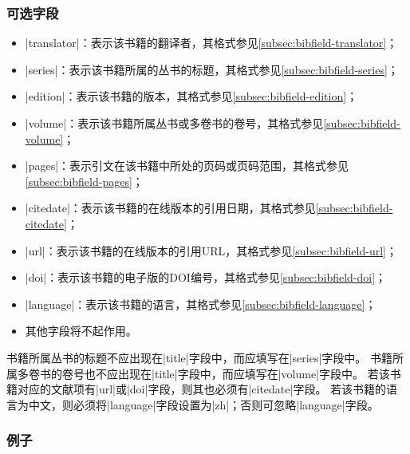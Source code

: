 \subsubsection{可选字段}

\begin{itemize}
\item |translator|：表示该书籍的翻译者，其格式参见\ref{subsec:bibfield-translator}；
\item |series|：表示该书籍所属的丛书的标题，其格式参见\ref{subsec:bibfield-series}；
\item |edition|：表示该书籍的版本，其格式参见\ref{subsec:bibfield-edition}；
\item |volume|：表示该书籍所属丛书或多卷书的卷号，其格式参见\ref{subsec:bibfield-volume}；
\item |pages|：表示引文在该书籍中所处的页码或页码范围，其格式参见\ref{subsec:bibfield-pages}；
\item |citedate|：表示该书籍的在线版本的引用日期，其格式参见\ref{subsec:bibfield-citedate}；
\item |url|：表示该书籍的在线版本的引用URL，其格式参见\ref{subsec:bibfield-url}；
\item |doi|：表示该书籍的电子版的DOI编号，其格式参见\ref{subsec:bibfield-doi}；
\item |language|：表示该书籍的语言，其格式参见\ref{subsec:bibfield-language}；
\item 其他字段将不起作用。
\end{itemize}

\begin{note}
书籍所属丛书的标题不应出现在|title|字段中，而应填写在|series|字段中。
书籍所属多卷书的卷号也不应出现在|title|字段中，而应填写在|volume|字段中。
若该书籍对应的文献项有|url|或|doi|字段，则其也必须有|citedate|字段。
若该书籍的语言为中文，则必须将|language|字段设置为|zh|；否则可忽略|language|字段。
\end{note}

\subsubsection{例子}

